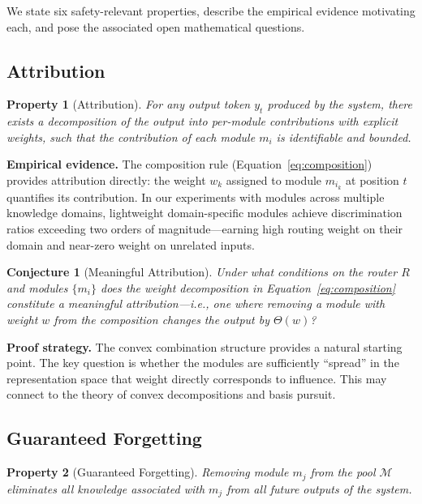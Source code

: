 \documentclass[11pt,a4paper]{article}
\newtheorem{property}{Property}
\newtheorem{conjecture}{Conjecture}
\begin{document}
We state six safety-relevant properties, describe the empirical evidence motivating each, and pose the associated open mathematical questions.

\subsection{Attribution}
\label{sec:attribution}

\begin{property}[Attribution]
For any output token $y_t$ produced by the system, there exists a decomposition of the output into per-module contributions with explicit weights, such that the contribution of each module $m_i$ is identifiable and bounded.
\end{property}

\noindent\textbf{Empirical evidence.} The composition rule (Equation~\ref{eq:composition}) provides attribution directly: the weight $w_k$ assigned to module $m_{i_k}$ at position $t$ quantifies its contribution. In our experiments with modules across multiple knowledge domains, lightweight domain-specific modules achieve discrimination ratios exceeding two orders of magnitude---earning high routing weight on their domain and near-zero weight on unrelated inputs.

\begin{conjecture}[Meaningful Attribution]
Under what conditions on the router $R$ and modules $\{m_i\}$ does the weight decomposition in Equation~\ref{eq:composition} constitute a \emph{meaningful} attribution---i.e., one where removing a module with weight $w$ from the composition changes the output by $\Theta(w)$?
\end{conjecture}

\noindent\textbf{Proof strategy.} The convex combination structure provides a natural starting point. The key question is whether the modules are sufficiently ``spread'' in the representation space that weight directly corresponds to influence. This may connect to the theory of convex decompositions and basis pursuit.

\subsection{Guaranteed Forgetting}
\label{sec:forgetting}

\begin{property}[Guaranteed Forgetting]
Removing module $m_j$ from the pool $\mathcal{M}$ eliminates all knowledge associated with $m_j$ from all future outputs of the system.
\end{property}
\end{document}
